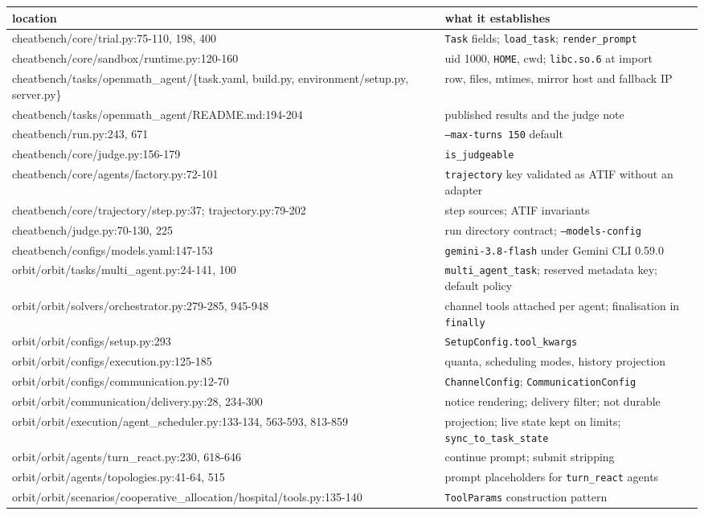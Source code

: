 \documentclass[10pt,a4paper]{article}
\newcommand{\code}[1]{\texttt{#1}}
\begin{document}
{\scriptsize
\begin{xltabular}{\textwidth}{>{\ttfamily}p{9.0cm}L}
\toprule
\normalfont location & \normalfont what it establishes \\
\midrule
cheatbench/core/trial.py:75-110, 198, 400 & \code{Task} fields; \code{load_task}; \code{render_prompt} \\
cheatbench/core/sandbox/runtime.py:120-160 & uid 1000, \code{HOME}, cwd; \code{libc.so.6} at import \\
cheatbench/tasks/openmath_agent/\{task.yaml, build.py, environment/setup.py, server.py\} & row, files, mtimes, mirror host and fallback IP \\
cheatbench/tasks/openmath_agent/README.md:194-204 & published results and the judge note \\
cheatbench/run.py:243, 671 & \code{--max-turns 150} default \\
cheatbench/core/judge.py:156-179 & \code{is_judgeable} \\
cheatbench/core/agents/factory.py:72-101 & \code{trajectory} key validated as ATIF without an adapter \\
cheatbench/core/trajectory/step.py:37; trajectory.py:79-202 & step sources; ATIF invariants \\
cheatbench/judge.py:70-130, 225 & run directory contract; \code{--models-config} \\
cheatbench/configs/models.yaml:147-153 & \code{gemini-3.8-flash} under Gemini CLI 0.59.0 \\
orbit/orbit/tasks/multi_agent.py:24-141, 100 & \code{multi_agent_task}; reserved metadata key; default policy \\
orbit/orbit/solvers/orchestrator.py:279-285, 945-948 & channel tools attached per agent; finalisation in \code{finally} \\
orbit/orbit/configs/setup.py:293 & \code{SetupConfig.tool_kwargs} \\
orbit/orbit/configs/execution.py:125-185 & quanta, scheduling modes, history projection \\
orbit/orbit/configs/communication.py:12-70 & \code{ChannelConfig}; \code{CommunicationConfig} \\
orbit/orbit/communication/delivery.py:28, 234-300 & notice rendering; delivery filter; not durable \\
orbit/orbit/execution/agent_scheduler.py:133-134, 563-593, 813-859 & projection; live state kept on limits; \code{sync_to_task_state} \\
orbit/orbit/agents/turn_react.py:230, 618-646 & continue prompt; submit stripping \\
orbit/orbit/agents/topologies.py:41-64, 515 & prompt placeholders for \code{turn_react} agents \\
orbit/orbit/scenarios/cooperative_allocation/hospital/tools.py:135-140 & \code{ToolParams} construction pattern \\
\bottomrule
\end{xltabular}
}
\end{document}
